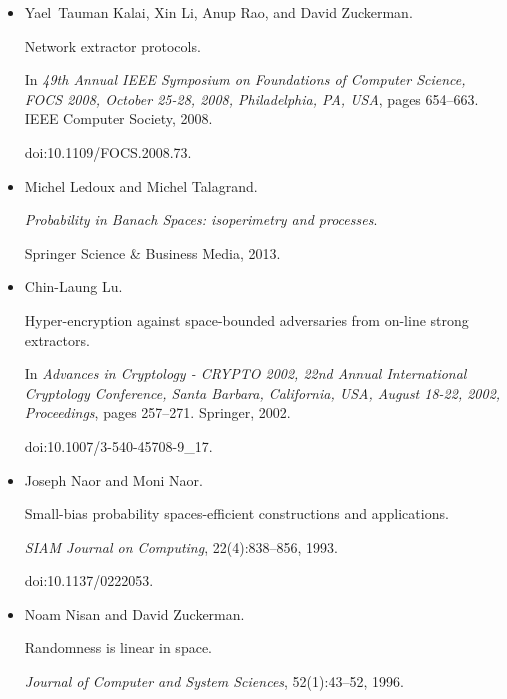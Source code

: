\begin{itemize}
\item[] 
[24]

Yael Tauman Kalai, Xin Li, Anup Rao, and David Zuckerman.


Network extractor protocols.


In \emph{49th Annual IEEE Symposium on Foundations of Computer
Science, FOCS 2008, October 25-28, 2008, Philadelphia, PA, USA}, pages
654–663. IEEE Computer Society, 2008.


doi:10.1109/FOCS.2008.73.





\item[] 
[25]

Michel Ledoux and Michel Talagrand.


\emph{Probability in Banach Spaces: isoperimetry and processes}.


Springer Science \& Business Media, 2013.





\item[] 
[26]

Chin-Laung Lu.


Hyper-encryption against space-bounded adversaries from on-line
strong extractors.


In \emph{Advances in Cryptology - CRYPTO 2002, 22nd Annual
International Cryptology Conference, Santa Barbara, California, USA, August
18-22, 2002, Proceedings}, pages 257–271. Springer, 2002.


doi:10.1007/3-540-45708-9\_17.





\item[] 
[27]

Joseph Naor and Moni Naor.


Small-bias probability spaces-efficient constructions and
applications.


\emph{SIAM Journal on Computing}, 22(4):838–856, 1993.


doi:10.1137/0222053.





\item[] 
[28]

Noam Nisan and David Zuckerman.


Randomness is linear in space.


\emph{Journal of Computer and System Sciences}, 52(1):43–52, 1996.



\end{itemize}
